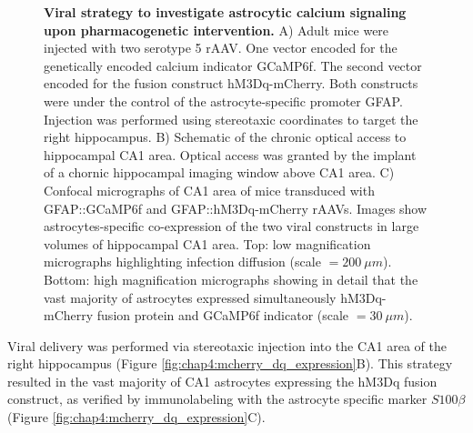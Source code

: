\begin{figure}[h!]
    \caption[Viral strategy to investigate astrocytic calcium signaling upon pharmacogenetic intervention.]{\textbf{Viral strategy to investigate astrocytic calcium signaling upon pharmacogenetic intervention.} 
    A) Adult mice were injected with two serotype 5 rAAV.
    One vector encoded for the genetically encoded calcium indicator GCaMP6f.
    The second vector encoded for the fusion construct hM3Dq-mCherry.
    Both constructs were under the control of the astrocyte-specific promoter GFAP.
    Injection was performed using stereotaxic coordinates to target the right hippocampus.
    B) Schematic of the chronic optical access to hippocampal CA1 area. 
    Optical access was granted by the implant of a chornic hippocampal imaging window above CA1 area. 
    C) Confocal micrographs of CA1 area of mice transduced with GFAP::GCaMP6f and GFAP::hM3Dq-mCherry rAAVs. 
    Images show astrocytes-specific co-expression of the two viral constructs in large volumes of hippocampal CA1 area. 
    Top: low magnification micrographs highlighting infection diffusion (scale $= 200\ \mu m$). 
    Bottom: high magnification micrographs showing in detail that the vast majority of astrocytes expressed simultaneously hM3Dq-mCherry fusion protein and GCaMP6f indicator (scale $= 30\ \mu m$).}
    \label{fig:chap4:mcherry_gcamp_expression}
\end{figure}
Viral delivery was performed via stereotaxic injection into the CA1 area of the right hippocampus (Figure \ref{fig:chap4:mcherry_dq_expression}B).
This strategy resulted in the vast majority of CA1 astrocytes expressing the hM3Dq fusion construct, as verified by immunolabeling with the astrocyte specific marker $S100\beta$ (Figure \ref{fig:chap4:mcherry_dq_expression}C).
